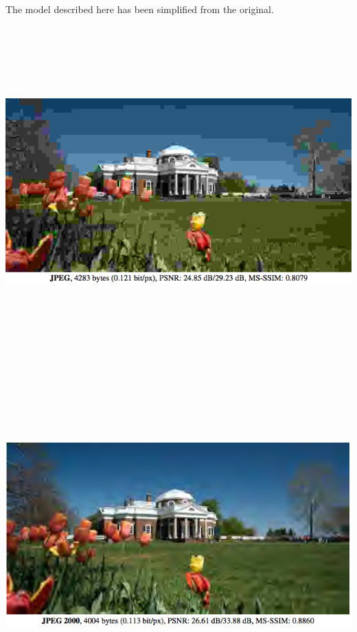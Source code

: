 {\vfill
The model described here has been simplified from the original.



\bigskip
\centerline{\includegraphics[height=5in]{../images/RateDist2}}


\bigskip
\centerline{\includegraphics[height= 5in]{../images/RateDist3}}

}
